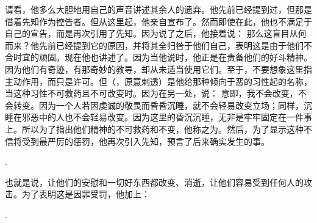 请看，他多么大胆地用自己的声音讲述其余人的遗弃。他先前已经提到过，但那是借着先知作为控告者。但从这里起，他亲自宣布了。然而即使在此，他也不满足于自己的宣告，而是再次引用了先知。因为说了之后，他接着说： 那么这盲目从何而来？他先前已经提到它的原因，并将其全归咎于他们自己，表明这是由于他们不合时宜的顽固。现在他也讲述了。因为当他说时，他正是在责备他们的好斗精神。因为他们有奇迹，有那奇妙的教导，却从未适当使用它们。至于，不要想象这里指主动作用，而只是许可。但（，原意刺透）是他给那种倾向于恶的习性起的名称，当这种习性不可救药且不可改变时。因为在另一处，说：  意即，我不会改变，不会转变。因为一个人若因虔诚的敬畏而昏昏沉睡，就不会轻易改变立场；同样，沉睡在邪恶中的人也不会轻易改变。因为这里的昏沉沉睡，无非是牢牢固定在一件事上。所以为了指出他们精神的不可救药和不变，他称之为。然后，为了显示这种不信将受到最严厉的惩罚，他再次引入先知，预言了后来确实发生的事。\par

.  \par

也就是说，让他们的安慰和一切好东西都改变、消逝，让他们容易受到任何人的攻击。为了表明这是因罪受罚，他加上：\par

. \par

